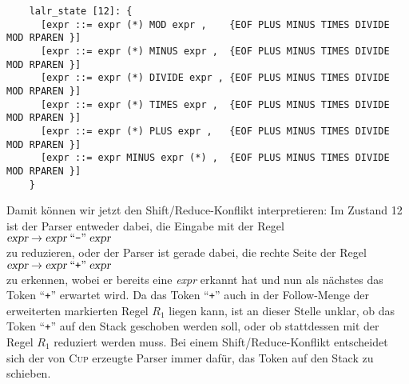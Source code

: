 \begin{verbatim}
    lalr_state [12]: {
      [expr ::= expr (*) MOD expr ,    {EOF PLUS MINUS TIMES DIVIDE MOD RPAREN }]
      [expr ::= expr (*) MINUS expr ,  {EOF PLUS MINUS TIMES DIVIDE MOD RPAREN }]
      [expr ::= expr (*) DIVIDE expr , {EOF PLUS MINUS TIMES DIVIDE MOD RPAREN }]
      [expr ::= expr (*) TIMES expr ,  {EOF PLUS MINUS TIMES DIVIDE MOD RPAREN }]
      [expr ::= expr (*) PLUS expr ,   {EOF PLUS MINUS TIMES DIVIDE MOD RPAREN }]
      [expr ::= expr MINUS expr (*) ,  {EOF PLUS MINUS TIMES DIVIDE MOD RPAREN }]
    }
\end{verbatim}
Damit k\"onnen wir jetzt den
Shift/Reduce-Konflikt interpretieren: Im Zustand 12 ist der Parser entweder dabei, die
Eingabe mit der Regel 
\\[0.2cm]
\hspace*{1.3cm}
$\textsl{expr} \rightarrow \textsl{expr} \;\mbox{``\texttt{-}''}\; \textsl{expr}$
\\[0.2cm]
zu reduzieren, oder der Parser ist gerade dabei, die rechte Seite der Regel 
\\[0.2cm]
\hspace*{1.3cm}
$\textsl{expr} \rightarrow \textsl{expr} \;\mbox{``\texttt{+}''}\; \textsl{expr}$
\\[0.2cm]
zu erkennen, wobei er bereits eine \textsl{expr} erkannt hat und nun als n\"achstes das
Token ``\texttt{+}'' erwartet wird.  Da das Token ``\texttt{+}'' auch in der Follow-Menge der
erweiterten markierten Regel $R_1$ liegen kann, ist an dieser Stelle unklar, ob das Token
``\texttt{+}'' auf den 
Stack geschoben werden soll, oder ob stattdessen mit der Regel $R_1$ reduziert werden
muss.  Bei einem Shift/Reduce-Konflikt entscheidet sich der von \textsc{Cup} erzeugte
Parser immer daf\"ur, das Token auf den Stack zu schieben.


